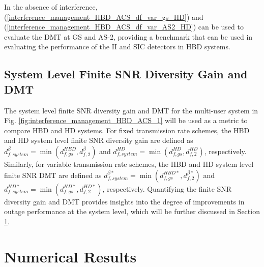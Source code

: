 In the absence of interference, (\ref{interference_management_HBD_ACS_df_var_gs_HD}) and (\ref{interference_management_HBD_ACS_df_var_AS2_HD}) can be used to evaluate the DMT at GS and AS-2, providing a benchmark that can be used in evaluating the performance of the II and SIC detectors in HBD systems.

\subsection{System Level Finite SNR Diversity Gain and DMT}

The system level finite SNR diversity gain and DMT for the multi-user system in Fig. \ref{fig:interference_management_HBD_ACS_1} will be used as a metric to compare HBD and HD systems. For fixed transmission rate schemes, the HBD and HD system level finite SNR diversity gain are defined as $d_{f,system}^{\beta} = \min\left( d_{f,gs}^{HBD}, d_{f,2}^{\beta} \right)$ and $d_{f,system}^{HD} = \min\left( d_{f,gs}^{HD}, d_{f,2}^{HD} \right)$, respectively. Similarly, for variable transmission rate schemes, the HBD and HD system level finite SNR DMT are defined as $d_{f,system}^{\beta*} = \min\left( d_{f,gs}^{HBD*}, d_{f,2}^{\beta*} \right)$ and $d_{f,system}^{HD*} = \min\left( d_{f,gs}^{HD*}, d_{f,2}^{HD*} \right)$, respectively. Quantifying the finite SNR diversity gain and DMT provides insights into the degree of improvements in outage performance at the system level, which will be further discussed in Section \ref{interference_management_HBD_ACS_num_sec}.  
\section{Numerical Results} \label{interference_management_HBD_ACS_num_sec}

